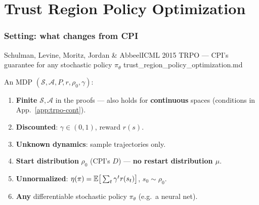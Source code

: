 \clearpage
\part{Trust Region Policy Optimization}


\section{Setting: what changes from CPI}

  {Schulman, Levine, Moritz, Jordan \& Abbeel}{ICML 2015}
  {TRPO --- CPI's guarantee for any stochastic policy $\pi_\theta$}
  {trust\_region\_policy\_optimization.md}

An MDP $(\mathcal{S}, \mathcal{A}, P, r, \rho_0, \gamma)$:

\begin{enumerate}
  \item \textbf{Finite} $\mathcal{S},\mathcal{A}$ in the proofs --- also holds for \textbf{continuous} spaces (conditions in App.~\ref{app:trpo-cont}).
  \item \textbf{Discounted}: $\gamma\in(0,1)$, reward $r(s)$.
  \item \textbf{Unknown dynamics}: sample trajectories only.
  \item \textbf{Start distribution} $\rho_0$ (CPI's $D$) --- {\color{BadRed}\textbf{no restart distribution $\mu$}}.
  \item \textbf{Unnormalized}: $\eta(\pi)=\mathbb{E}\big[\sum_t\gamma^t r(s_t)\big]$, $s_0\sim\rho_0$.
  \item \textbf{Any} differentiable stochastic policy $\pi_\theta$ (e.g.\ a neural net).
\end{enumerate}

